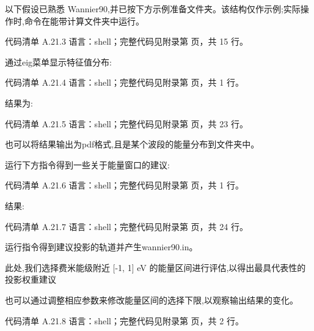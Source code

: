 \documentclass[lang=cn,scheme=chinese,color=blue,device=normal,toc=onecol,math=cm]{elegantbook}
\begin{document}
以下假设已熟悉 Wannier90,并已按下方示例准备文件夹。该结构仅作示例;实际操作时,命令在能带计算文件夹中运行。\par


\begin{codeindexbox}{代码清单 A.21.3}
语言：shell；完整代码见附录第 \pageref{code:21:3} 页，共 15 行。
\end{codeindexbox}


通过eig菜单显示特征值分布:\par


\begin{codeindexbox}{代码清单 A.21.4}
语言：shell；完整代码见附录第 \pageref{code:21:4} 页，共 1 行。
\end{codeindexbox}


结果为:\par


\begin{codeindexbox}{代码清单 A.21.5}
语言：shell；完整代码见附录第 \pageref{code:21:5} 页，共 23 行。
\end{codeindexbox}


也可以将结果输出为pdf格式,且是某个波段的能量分布到文件夹中。\par


运行下方指令得到一些关于能量窗口的建议:\par


\begin{codeindexbox}{代码清单 A.21.6}
语言：shell；完整代码见附录第 \pageref{code:21:6} 页，共 1 行。
\end{codeindexbox}


结果:\par


\begin{codeindexbox}{代码清单 A.21.7}
语言：shell；完整代码见附录第 \pageref{code:21:7} 页，共 24 行。
\end{codeindexbox}


运行指令得到建议投影的轨道并产生wannier90.in。\par


此处,我们选择费米能级附近 [-1, 1] eV 的能量区间进行评估,以得出最具代表性的投影权重建议\par


也可以通过调整相应参数来修改能量区间的选择下限,以观察输出结果的变化。\par


\begin{codeindexbox}{代码清单 A.21.8}
语言：shell；完整代码见附录第 \pageref{code:21:8} 页，共 2 行。
\end{codeindexbox}
\end{document}

